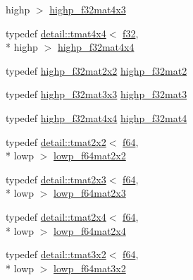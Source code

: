 \begin{DoxyCompactItemize}
highp $>$ \hyperlink{group__gtc__type__precision_ga5bd692575886422f501a379386e391d9}{highp\-\_\-f32mat4x3}
\item 
typedef \hyperlink{structglm_1_1detail_1_1tmat4x4}{detail\-::tmat4x4}$<$ \hyperlink{group__gtc__type__precision_ga0ec999b57f5330d9021256e96038df04}{f32}, \\*
highp $>$ \hyperlink{group__gtc__type__precision_gafe24f12e4f5453058caea3f583ad7d9c}{highp\-\_\-f32mat4x4}
\item 
typedef \hyperlink{group__gtc__type__precision_gaf3a2cc948ca6fd168391138ce6fdd100}{highp\-\_\-f32mat2x2} \hyperlink{group__gtc__type__precision_gaed934f561aaf8ad891c0a8f5e719aea8}{highp\-\_\-f32mat2}
\item 
typedef \hyperlink{group__gtc__type__precision_ga334eca23d23aef90972fb20c5b749ca3}{highp\-\_\-f32mat3x3} \hyperlink{group__gtc__type__precision_ga06809818db73785334f839742a9ad85a}{highp\-\_\-f32mat3}
\item 
typedef \hyperlink{group__gtc__type__precision_gafe24f12e4f5453058caea3f583ad7d9c}{highp\-\_\-f32mat4x4} \hyperlink{group__gtc__type__precision_gac14c1bfb647e39d459c7489ede2156cc}{highp\-\_\-f32mat4}
\item 
typedef \hyperlink{structglm_1_1detail_1_1tmat2x2}{detail\-::tmat2x2}$<$ \hyperlink{group__gtc__type__precision_ga2bba392e555124b36cde6abba349bab3}{f64}, \\*
lowp $>$ \hyperlink{group__gtc__type__precision_ga38e41c5332b4eb20b23b4ed1f06608d4}{lowp\-\_\-f64mat2x2}
\item 
typedef \hyperlink{structglm_1_1detail_1_1tmat2x3}{detail\-::tmat2x3}$<$ \hyperlink{group__gtc__type__precision_ga2bba392e555124b36cde6abba349bab3}{f64}, \\*
lowp $>$ \hyperlink{group__gtc__type__precision_ga2add7d48faba102f53fbad2e14dfed12}{lowp\-\_\-f64mat2x3}
\item 
typedef \hyperlink{structglm_1_1detail_1_1tmat2x4}{detail\-::tmat2x4}$<$ \hyperlink{group__gtc__type__precision_ga2bba392e555124b36cde6abba349bab3}{f64}, \\*
lowp $>$ \hyperlink{group__gtc__type__precision_ga38366c50f2a2755c49110c7fc1441683}{lowp\-\_\-f64mat2x4}
\item 
typedef \hyperlink{structglm_1_1detail_1_1tmat3x2}{detail\-::tmat3x2}$<$ \hyperlink{group__gtc__type__precision_ga2bba392e555124b36cde6abba349bab3}{f64}, \\*
lowp $>$ \hyperlink{group__gtc__type__precision_ga99f6455a37a4c407a26981561184c76d}{lowp\-\_\-f64mat3x2}

\end{DoxyCompactItemize}
